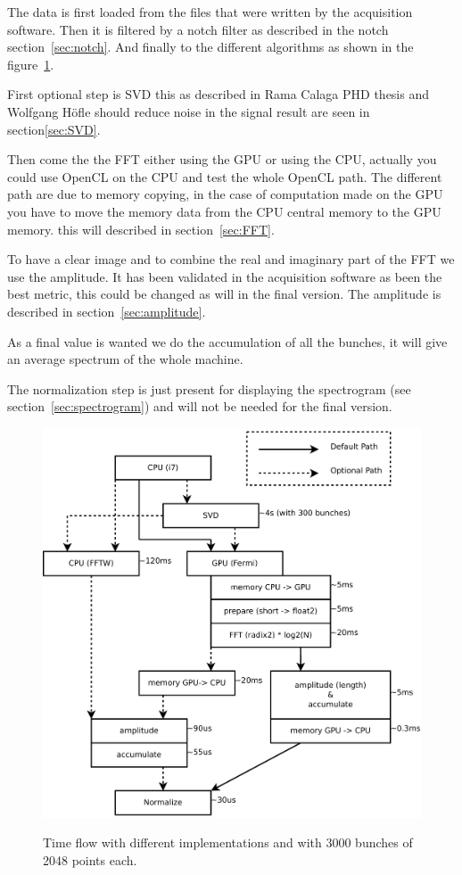 	The data is first loaded from the files that were written by the acquisition software. Then it is filtered by a notch filter as described in the notch section~\ref{sec:notch}. And finally to the different algorithms as shown in the figure~\ref{fig:PCFlow}.

	First optional step is \gls{SVD} this as described in Rama Calaga PHD thesis\cite{calaga06} and Wolfgang H{\"o}fle\cite{HofleChamonix12} should reduce noise in the signal result are seen in section\ref{sec:SVD}.

	Then come the the \gls{FFT} either using the \gls{GPU} or using the \gls{CPU}, actually you could use \gls{OpenCL} on the \gls{CPU} and test the whole \gls{OpenCL} path. The different path are due to memory copying, in the case of computation made on the \gls{GPU} you have to move the memory data from the \gls{CPU} central memory to the \gls{GPU} memory. this will described in section~\ref{sec:FFT}.

	To have a clear image and to combine the real and imaginary part of the \gls{FFT} we use the amplitude. It has been validated in the acquisition software as been the best metric, this could be changed as will in the final version. The amplitude is described in section~\ref{sec:amplitude}.

	As a final value is wanted we do the accumulation of all the bunches, it will give an average spectrum of the whole machine.

	The normalization step is just present for displaying the spectrogram (see section~\ref{sec:spectrogram}) and will not be needed for the final version.
 
	\begin{figure}[h]
	\caption{Time flow with different implementations and with 3000 bunches of 
	2048 points each.}
	\centering
	\includegraphics[scale=0.3]{PC-flow.pdf}
	\label{fig:PCFlow}
	\end{figure}

